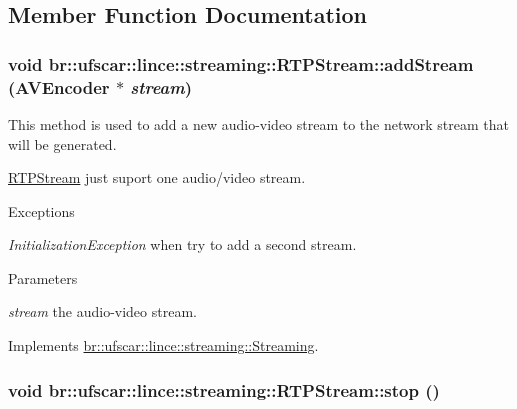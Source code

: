 \subsection{Member Function Documentation}
\hypertarget{classbr_1_1ufscar_1_1lince_1_1streaming_1_1RTPStream_a5533a25709c548aada927315b845b4f3}{
\subsubsection[{addStream}]{\setlength{\rightskip}{0pt plus 5cm}void br::ufscar::lince::streaming::RTPStream::addStream ({\bf AVEncoder} $\ast$ {\em stream})}}
\label{classbr_1_1ufscar_1_1lince_1_1streaming_1_1RTPStream_a5533a25709c548aada927315b845b4f3}


This method is used to add a new audio-\/video stream to the network stream that will be generated. 

\hyperlink{classbr_1_1ufscar_1_1lince_1_1streaming_1_1RTPStream}{RTPStream} just suport one audio/video stream. 
\begin{DoxyExceptions}{Exceptions}
\item[{\em InitializationException}]when try to add a second stream. \end{DoxyExceptions}

\begin{DoxyParams}{Parameters}
\item[{\em stream}]the audio-\/video stream. \end{DoxyParams}


Implements \hyperlink{classbr_1_1ufscar_1_1lince_1_1streaming_1_1Streaming_ab2739b46d9bd285d4d64100b9d5bb796}{br::ufscar::lince::streaming::Streaming}.

\hypertarget{classbr_1_1ufscar_1_1lince_1_1streaming_1_1RTPStream_a2b4ccacba5f834f28d12c7709d0ec65d}{
\subsubsection[{stop}]{\setlength{\rightskip}{0pt plus 5cm}void br::ufscar::lince::streaming::RTPStream::stop ()}}
\label{classbr_1_1ufscar_1_1lince_1_1streaming_1_1RTPStream_a2b4ccacba5f834f28d12c7709d0ec65d}


